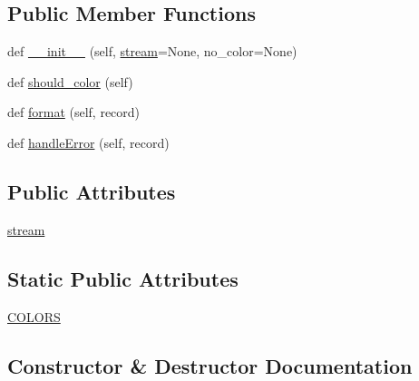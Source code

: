 \subsection*{Public Member Functions}
\begin{DoxyCompactItemize}
\item 
def \hyperlink{classpip_1_1__internal_1_1utils_1_1logging_1_1ColorizedStreamHandler_af17a12d8bf73767811ee7af0bd6ee649}{\+\_\+\+\_\+init\+\_\+\+\_\+} (self, \hyperlink{classpip_1_1__internal_1_1utils_1_1logging_1_1ColorizedStreamHandler_a10d6dd5ad74f65d0814bd61b16fdbd9c}{stream}=None, no\+\_\+color=None)
\item 
def \hyperlink{classpip_1_1__internal_1_1utils_1_1logging_1_1ColorizedStreamHandler_ae2a17f5081e545f5aebbd1796d0b1b21}{should\+\_\+color} (self)
\item 
def \hyperlink{classpip_1_1__internal_1_1utils_1_1logging_1_1ColorizedStreamHandler_ab486689630cd72874c843dc410954bf6}{format} (self, record)
\item 
def \hyperlink{classpip_1_1__internal_1_1utils_1_1logging_1_1ColorizedStreamHandler_a8f90092882446c1c4bdd13c6b750dcaa}{handle\+Error} (self, record)
\end{DoxyCompactItemize}
\subsection*{Public Attributes}
\begin{DoxyCompactItemize}
\item 
\hyperlink{classpip_1_1__internal_1_1utils_1_1logging_1_1ColorizedStreamHandler_a10d6dd5ad74f65d0814bd61b16fdbd9c}{stream}
\end{DoxyCompactItemize}
\subsection*{Static Public Attributes}
\begin{DoxyCompactItemize}
\item 
\hyperlink{classpip_1_1__internal_1_1utils_1_1logging_1_1ColorizedStreamHandler_ab2f07132a25367219a034f0613b7e340}{C\+O\+L\+O\+RS}
\end{DoxyCompactItemize}


\subsection{Constructor \& Destructor Documentation}
\mbox{\label{classpip_1_1__internal_1_1utils_1_1logging_1_1ColorizedStreamHandler_af17a12d8bf73767811ee7af0bd6ee649}} 
